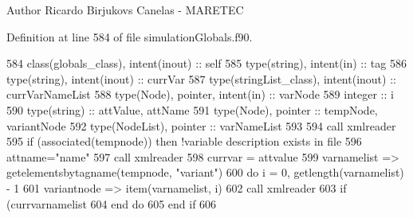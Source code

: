 \begin{DoxyAuthor}{Author}
Ricardo Birjukovs Canelas -\/ M\+A\+R\+E\+T\+EC 
\end{DoxyAuthor}


Definition at line 584 of file simulation\+Globals.\+f90.


\begin{DoxyCode}
584     \textcolor{keywordtype}{class}(globals\_class), \textcolor{keywordtype}{intent(inout)} :: self
585     \textcolor{keywordtype}{type}(string), \textcolor{keywordtype}{intent(in)} :: tag
586     \textcolor{keywordtype}{type}(string), \textcolor{keywordtype}{intent(inout)} :: currVar
587     \textcolor{keywordtype}{type}(stringList\_class), \textcolor{keywordtype}{intent(inout)} :: currVarNameList
588     \textcolor{keywordtype}{type}(Node), \textcolor{keywordtype}{pointer}, \textcolor{keywordtype}{intent(in)} :: varNode
589     \textcolor{keywordtype}{integer} :: i
590     \textcolor{keywordtype}{type}(string) :: attValue, attName
591     \textcolor{keywordtype}{type}(Node), \textcolor{keywordtype}{pointer} :: tempNode, variantNode
592     \textcolor{keywordtype}{type}(NodeList), \textcolor{keywordtype}{pointer} :: varNameList
593 
594     \textcolor{keyword}{call }xmlreader%
595     \textcolor{keywordflow}{if} (\textcolor{keyword}{associated}(tempnode)) \textcolor{keywordflow}{then} \textcolor{comment}{!variable description exists in file}
596         attname=\textcolor{stringliteral}{"name"}
597         \textcolor{keyword}{call }xmlreader%
598         currvar = attvalue
599         varnamelist => getelementsbytagname(tempnode, \textcolor{stringliteral}{"variant"})
600         \textcolor{keywordflow}{do} i = 0, getlength(varnamelist) - 1
601             variantnode => item(varnamelist, i)
602             \textcolor{keyword}{call }xmlreader%
603             \textcolor{keywordflow}{if} (currvarnamelist%
604 \textcolor{keywordflow}{        end do}
605 \textcolor{keywordflow}{    end if}
606 
\end{DoxyCode}
\mbox{\label{namespacesimulationglobals__mod_aa01e0a958ef2e94a02991dcfe390bfa0}} 
